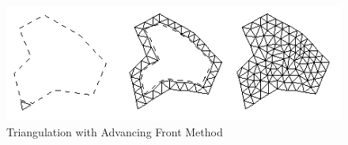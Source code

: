 \begin{figure}[H]
	\caption{Triangulation with Advancing Front Method}
	\centering
	\includegraphics[scale = 1]{advancing}
\end{figure}
